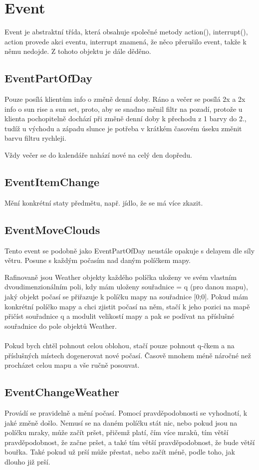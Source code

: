 \documentclass[12pt,a4paper]{report}
\begin{document}
\section{Event}
Event je abstraktní třída, která obsahuje společné metody action(), interrupt(), action provede akci eventu, interrupt znamená, že něco přerušilo event, takže k němu nedojde.
Z tohoto objektu je dále děděno.
\subsection{EventPartOfDay}
Pouze posílá klientům info o změně denní doby. Ráno a večer se posílá 2x a 2x info o sun rise a sun set, proto, aby se snadno měnil filtr na pozadí, protože u klienta pochopitelně dochází při změně denní doby k přechodu z 1 barvy do 2., tudíž u východu a západu slunce je potřeba v krátkém časovém úseku změnit barvu filtru rychleji.  

Vždy večer se do kalendáře nahází nové na celý den dopředu.

\subsection{EventItemChange}
Mění konkrétní staty předmětu, např. jídlo, že se má více zkazit.

\subsection{EventMoveClouds}
Tento event se podobně jako EventPartOfDay neustále opakuje s delayem dle síly větru. Posune s každým počasím nad daným políčkem mapy. 

Rafinovaně jsou Weather objekty každého políčka uloženy ve svém vlastním dvoudimenzionálním poli, kdy mám uloženy souřadnice = q (pro danou mapu), jaký objekt počasí se přiřazuje k políčku mapy na souřadnice [0;0]. Pokud mám konkrétní políčko mapy a chci zjistit počasí na něm, stačí k jeho pozici na mapě přičíst souřadnice q a modulit velikostí mapy a pak se podívat na příslušné souřadnice do pole objektů Weather. 

\paragraph{}
Pokud bych chtěl pohnout celou oblohou, stačí pouze pohnout q-čkem a na příslušných místech dogenerovat nové počasí. Časově mnohem méně náročné než procházet celou mapu a vše ručně posouvat.
\subsection{EventChangeWeather}
Provádí se pravidelně a mění počasí. Pomocí pravděpodobnosti se vyhodnotí, k jaké změně došlo. Nemusí se na daném políčku stát nic, nebo pokud jsou na políčku mraky, může začít pršet, přičemž platí, čím více mraků, tím větší pravděpodobnost, že začne pršet, a také tím větší pravděpodobnost, že bude větší bouřka. Také pokud už prší může přestat, nebo začít méně, podle toho, jak dlouho již prší. 
\end{document}
